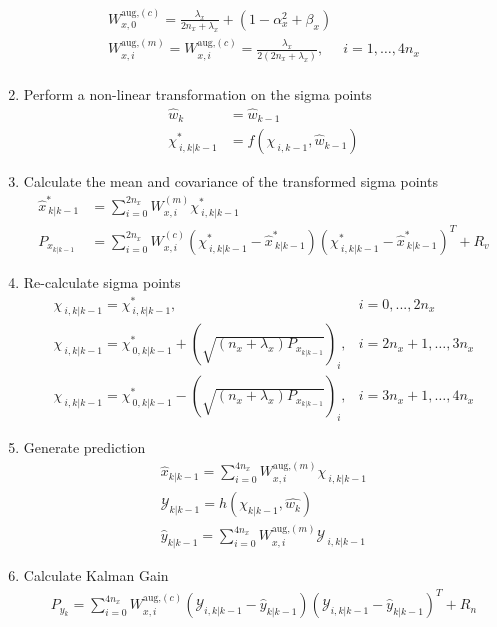 \begin{enumerate}
\begin{align}
        W^{\text{aug,}(c)}_{x,0} = \frac{\lambda_{x}}{2n_{x}+ \lambda_{x} } + (1 - \alpha^{2}_{x} + \beta_{x}) \\
        W^{\text{aug,}(m)}_{x,i} = W^{\text{aug,}(c)}_{x,i} = \frac{\lambda_{x}}{2(2n_{x}+ \lambda_{x}) }, &  i=1,\dots,4n_{x} \\
    \end{align}
    \item Perform a non-linear transformation on the sigma points
    \begin{align}
        \hat{w}_{k} &= \hat{w}_{k-1} \\
        \chi^{*}_{\ i,k|k-1} &= f(\chi_{\ i,k-1},\hat{w}_{k-1})
    \end{align}
    \item Calculate the mean and covariance of the transformed sigma points
    \begin{align}
        \hat{x}^{*}_{\ k|k-1} &= \sum_{i=0}^{2n_{x}} W^{(m)}_{x,i} \chi^{*}_{\ i, k|k-1} \\
        P_{x_{k|k-1}} &=  \sum_{i=0}^{2n_{x}} W^{(c)}_{x,i} (\chi^{*}_{\ i, k|k-1} - \hat{x}^{*}_{\ k|k-1})(\chi^{*}_{\ i, k|k-1} - \hat{x}^{*}_{\ k|k-1})^{T} + R_{v} %
    \end{align}
    \item Re-calculate sigma points
    \begin{align}
        \chi_{\ i, k|k-1} = \chi^{*}_{\ i,k|k-1}, & i=0,...,2n_{x} \\
        \chi_{\ i, k|k-1} = \chi^{*}_{\ 0,k|k-1} + (\sqrt{(n_{x}+\lambda_{x})P_{x_{k|k-1}}})_{i},  & i=2n_{x}+1,\dots,3n_{x} \\
        \chi_{\ i, k|k-1} = \chi^{*}_{\ 0,k|k-1} - (\sqrt{(n_{x}+\lambda_{x})P_{x_{k|k-1}}})_{i}, &  i=3n_{x}+1,\dots,4n_{x}
    \end{align}
    \item Generate prediction
    \begin{align}
        \hat{x}_{k|k-1} = \sum_{i=0}^{4n_{x}} W^{\text{aug,}(m)}_{x,i} \chi_{\ i, k|k-1} \\
        \mathcal{Y}_{k|k-1} = h(\chi_{k|k-1},\hat{w_{k}}) \\
        \hat{y}_{k|k-1} = \sum_{i=0}^{4n_{x}} W^{\text{aug,}(m)}_{x,i} \mathcal{Y}_{\ i, k|k-1}
    \end{align}
    \item Calculate Kalman Gain
    \begin{align}
        P_{y_{k}} = \sum_{i=0}^{4n_{x}} W^{\text{aug,}(c)}_{x,i} (\mathcal{Y}_{i, k|k-1} - \hat{y}_{k|k-1})(\mathcal{Y}_{i, k|k-1} - \hat{y}_{k|k-1})^{T} + R_{n}  \\ %

\end{align}
\end{enumerate}
